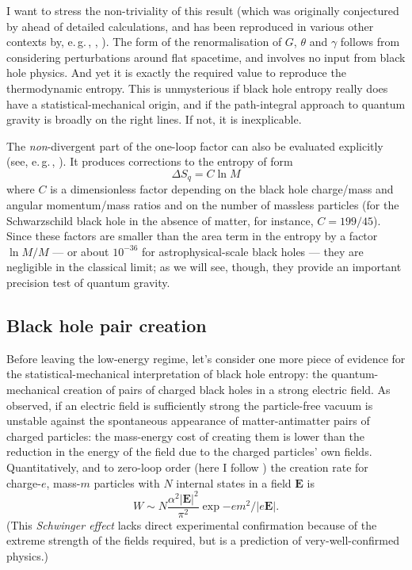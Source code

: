 \documentclass[12pt]{article}
\newcommand{\egc}{\mbox{e.\,g.\,}}
\newcommand{\vctr}[1]{\ensuremath{\mathbf{ #1 }}}
\newcommand{\be}{\begin{equation}}
\newcommand{\ee}{\end{equation}}
\begin{document}
I want to stress the non-triviality of this result (which was originally conjectured by  ahead of detailed calculations, and has been reproduced in various other contexts by, \egc, , ). The form of the renormalisation of $G$, $\theta$ and $\gamma$ follows from considering perturbations around flat spacetime, and involves no input from black hole physics. And yet it is exactly the required value to reproduce the thermodynamic entropy. This is  unmysterious if black hole entropy really does have a statistical-mechanical origin, and if the path-integral approach to quantum gravity is broadly on the right lines. If not, it is inexplicable.

The \emph{non}-divergent part of the one-loop factor can also be evaluated explicitly (see, \egc, ). It produces corrections to the entropy of form
\be
\Delta S_q = C \ln M
\ee
where $C$ is a dimensionless factor depending on the black hole charge/mass and angular momentum/mass ratios and on the number of massless particles (for the Schwarzschild black hole in the absence of matter, for instance,  $C=199/45$). Since these factors are smaller than the area term in the entropy by a factor $\ln M/M$ --- or about $10^{-36}$ for astrophysical-scale black holes --- they are negligible in the classical limit; as we will see, though, they provide an important precision test of quantum gravity.

\subsection{Black hole pair creation}

Before leaving the low-energy regime, let's consider one more piece of evidence for the statistical-mechanical interpretation of black hole entropy: the quantum-mechanical creation of pairs of charged black holes in a strong electric field. As  observed, if an electric field is sufficiently strong the particle-free vacuum is unstable against the spontaneous appearance of matter-antimatter pairs of charged particles: the mass-energy cost of creating them is lower than the reduction in the energy of the field due to the charged particles' own fields. Quantitatively, and to zero-loop order (here I follow ) the creation rate for charge-$e$, mass-$m$ particles with $N$ internal states in a field $\vctr{E}$ is
\be
W \sim N\frac{\alpha^2|\vctr{E}|^2}{\pi^2}\exp{- e m^2/|e\vctr{E}|}.
\ee
(This \emph{Schwinger effect} lacks direct experimental confirmation because of the extreme strength of the fields required, but is a prediction of very-well-confirmed physics.) 
\end{document}
